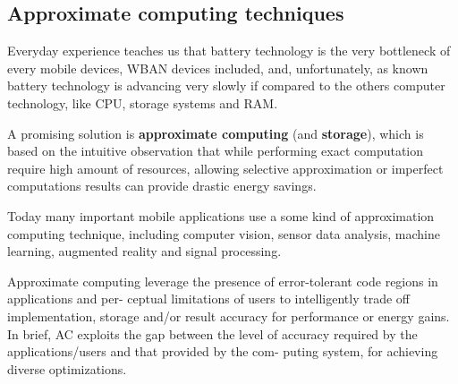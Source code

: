 \documentclass[sigchi]{acmart}
\begin{document}
\subsection{Approximate computing techniques}

Everyday experience teaches us that battery technology is the very bottleneck of every mobile devices, WBAN devices included, and, unfortunately, as known battery technology is advancing very slowly if compared to the others computer technology, like CPU, storage systems and RAM.

A promising solution is \textbf{approximate computing} (and \textbf{storage}), which is based on the intuitive observation that while performing exact computation require high amount of resources, allowing selective approximation or imperfect computations results can provide drastic energy savings.

Today many important mobile applications use a some kind of approximation computing technique, including computer vision, sensor data analysis, machine learning, augmented reality and signal processing. 

Approximate computing leverage the presence of error-tolerant code regions in applications and per-
ceptual limitations of users to intelligently trade off implementation, storage and/or
result accuracy for performance or energy gains. In brief, AC exploits the gap between
the level of accuracy required by the applications/users and that provided by the com-
puting system, for achieving diverse optimizations.








\appendix
\end{document}
